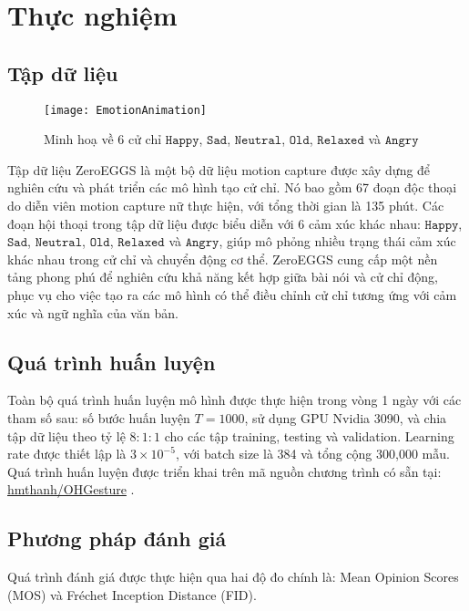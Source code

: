 \chapter{Thực nghiệm}
\label{Chapter4}

\section{Tập dữ liệu}

\begin{figure}
	\centering
	\texttt{[image: EmotionAnimation]}
	\caption{Minh hoạ về 6 cử chỉ $\texttt{Happy}$, $\texttt{Sad}$, $\texttt{Neutral}$, $\texttt{Old}$, $\texttt{Relaxed}$ và $\texttt{Angry}$}
\end{figure}

Tập dữ liệu ZeroEGGS \cite{ghorbani2023zeroeggs} là một bộ dữ liệu motion capture được xây dựng để nghiên cứu và phát triển các mô hình tạo cử chỉ. Nó bao gồm 67 đoạn độc thoại do diễn viên motion capture nữ thực hiện, với tổng thời gian là 135 phút. Các đoạn hội thoại trong tập dữ liệu được biểu diễn với 6 cảm xúc khác nhau: $\texttt{Happy}$, $\texttt{Sad}$, $\texttt{Neutral}$, $\texttt{Old}$, $\texttt{Relaxed}$ và $\texttt{Angry}$, giúp mô phỏng nhiều trạng thái cảm xúc khác nhau trong cử chỉ và chuyển động cơ thể. ZeroEGGS cung cấp một nền tảng phong phú để nghiên cứu khả năng kết hợp giữa bài nói và cử chỉ động, phục vụ cho việc tạo ra các mô hình có thể điều chỉnh cử chỉ tương ứng với cảm xúc và ngữ nghĩa của văn bản.


\section{Quá trình huấn luyện}

Toàn bộ quá trình huấn luyện mô hình được thực hiện trong vòng 1 ngày với các tham số sau: số bước huấn luyện $T = 1000$, sử dụng GPU Nvidia 3090, và chia tập dữ liệu theo tỷ lệ $8:1:1$ cho các tập training, testing và validation. Learning rate được thiết lập là $3 \times 10^{-5}$, với batch size là 384 và tổng cộng 300,000 mẫu. Quá trình huấn luyện được triển khai trên mã nguồn chương trình có sẵn tại: \hyperlink{https://github.com/hmthanh/OHGesture}{hmthanh/OHGesture} .

\section{Phương pháp đánh giá}
\label{sec:evaluation}

Quá trình đánh giá được thực hiện qua hai độ đo chính là: Mean Opinion Scores (MOS) và Fréchet Inception Distance (FID).

